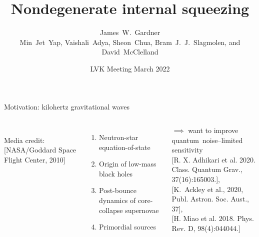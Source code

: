\documentclass[12pt,xcolor=dvipsnames,aspectratio=169]{beamer}
\title[\url{https://dcc.ligo.org/LIGO-P2200052}]{Nondegenerate internal squeezing}
\author[James~W.~Gardner et al.]{\texorpdfstring{\large{James~W.~Gardner}\\\small{Min~Jet~Yap, Vaishali~Adya, Sheon~Chua, Bram~J.~J.~Slagmolen, and David~McClelland}}{James~Gardner}}
\institute[]{\small The Centre for Gravitational Astrophysics, ANU}
\date{LVK Meeting March 2022}
\begin{document}

{
\begin{frame}[label=titleframe,noframenumbering]
\end{frame}}

{
\begin{frame}[noframenumbering]
\end{frame}}

\begin{frame}{Motivation: kilohertz gravitational waves}
\begin{columns}
\centering
\\
{\tiny Media credit: [NASA/Goddard Space Flight Center, 2010]}
\begin{enumerate}
\item Neutron-star equation-of-state
\item Origin of low-mass black holes
\item Post-bounce dynamics of core-collapse supernovae
\item Primordial sources
\end{enumerate}
$\implies$ want to improve \\ quantum~noise--limited sensitivity 
\\
\vspace{0.5cm}
\centering
{\tiny [R. X. Adhikari et al. 2020. Class. Quantum Grav., 37(16):165003.],
\\[0pt] [K.~Ackley et al., 2020, Publ. Astron. Soc. Aust., 37], 
\\[-7pt] [H. Miao et al. 2018. Phys. Rev. D, 98(4):044044.]}
\end{columns}
\end{frame}
\end{document}

